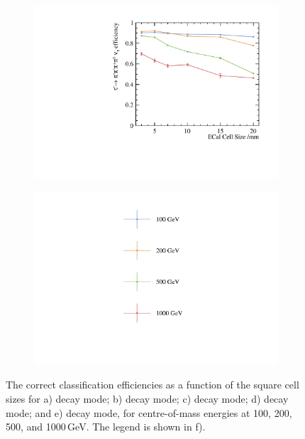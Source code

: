 \begin{figure}[htbp]
\begin{subfigure}[b]{0.45\textwidth}
  \includegraphics[width=\textwidth]{tau/plots3/decayMode6.pdf}
  \caption{}
  \label{fig:tauDecayMode6}
\end{subfigure}
\begin{subfigure}[b]{0.45\textwidth}
  \includegraphics[width=\textwidth]{tau/plots3/legend.pdf}
  \caption{}
  \label{fig:tauDecayLegend}
\end{subfigure}
\caption[The correct classification efficiency for  tau hadronic decay final states  as a function of the \ECAL square cell sizes]
{ The correct classification efficiencies as a function of the \ECAL square cell sizes for a) \tauToPion decay mode; b) \tauToRho decay mode; c) \tauToAiPhoton decay mode; d) \tauToAiPion decay mode; and e) \tauToThreePion decay mode, for centre-of-mass energies at 100, 200, 500, and 1000\,GeV. The legend is shown in f).}
\label{fig:TauPionEfficiency}
\end{figure}

